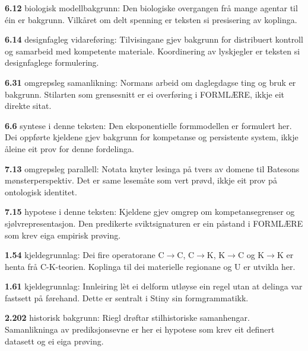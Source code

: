 \begin{widebody}
\noindent\hypertarget{kjeldenotat-6.12}{}\textbf{6.12} biologisk modellbakgrunn: Den biologiske overgangen frå mange agentar til éin er bakgrunn. Vilkåret om delt spenning er teksten si presisering av koplinga.\par\medskip
\noindent\hypertarget{kjeldenotat-6.14}{}\textbf{6.14} designfagleg vidareføring: Tilvisingane gjev bakgrunn for distribuert kontroll og samarbeid med kompetente materiale. Koordinering av lyskjegler er teksten si designfaglege formulering.\par\medskip
\noindent\hypertarget{kjeldenotat-6.31}{}\textbf{6.31} omgrepsleg samanlikning: Normans arbeid om daglegdagse ting og bruk er bakgrunn. Stilarten som grensesnitt er ei overføring i FORMLÆRE, ikkje eit direkte sitat.\par\medskip
\noindent\hypertarget{kjeldenotat-6.6}{}\textbf{6.6} syntese i denne teksten: Den eksponentielle formmodellen er formulert her. Dei oppførte kjeldene gjev bakgrunn for kompetanse og persistente system, ikkje åleine eit prov for denne fordelinga.\par\medskip
\noindent\hypertarget{kjeldenotat-7.13}{}\textbf{7.13} omgrepsleg parallell: Notata knyter lesinga på tvers av domene til Batesons mønsterperspektiv. Det er same lesemåte som vert prøvd, ikkje eit prov på ontologisk identitet.\par\medskip
\noindent\hypertarget{kjeldenotat-7.15}{}\textbf{7.15} hypotese i denne teksten: Kjeldene gjev omgrep om kompetansegrenser og sjølvrepresentasjon. Den predikerte sviktsignaturen er ein påstand i FORMLÆRE som krev eiga empirisk prøving.\par\medskip
\noindent\hypertarget{kjeldenotat-1.54}{}\textbf{1.54} kjeldegrunnlag: Dei fire operatorane C\ensuremath{→}C, C\ensuremath{→}K, K\ensuremath{→}C og K\ensuremath{→}K er henta frå C-K-teorien. Koplinga til dei materielle regionane og U er utvikla her.\par\medskip
\noindent\hypertarget{kjeldenotat-1.61}{}\textbf{1.61} kjeldegrunnlag: Innleiring lèt ei delform utløyse ein regel utan at delinga var fastsett på førehand. Dette er sentralt i Stiny sin formgrammatikk.\par\medskip
\noindent\hypertarget{kjeldenotat-2.202}{}\textbf{2.202} historisk bakgrunn: Riegl drøftar stilhistoriske samanhengar. Samanlikninga av prediksjonsevne er her ei hypotese som krev eit definert datasett og ei eiga prøving.\par\medskip

\end{widebody}
